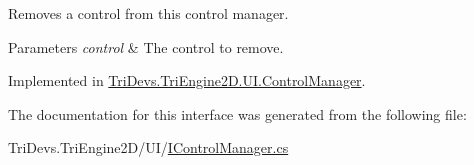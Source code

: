 Removes a control from this control manager. 


\begin{DoxyParams}{Parameters}
{\em control} & The control to remove.\\
\hline
\end{DoxyParams}


Implemented in \hyperlink{class_tri_devs_1_1_tri_engine2_d_1_1_u_i_1_1_control_manager_adfba4b495200237df9fe1a639e4d3cd1}{Tri\-Devs.\-Tri\-Engine2\-D.\-U\-I.\-Control\-Manager}.



The documentation for this interface was generated from the following file\-:\begin{DoxyCompactItemize}
\item 
Tri\-Devs.\-Tri\-Engine2\-D/\-U\-I/\hyperlink{_i_control_manager_8cs}{I\-Control\-Manager.\-cs}\end{DoxyCompactItemize}
